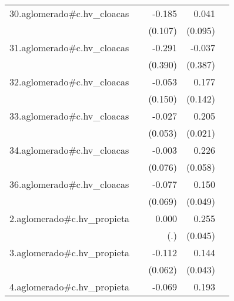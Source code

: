 {\begin{longtable}{l*{4}{D{.}{.}{-1}}}
\addlinespace
30.aglomerado#c.hv\_cloacas&                     &      -0.185         &       0.041         &                     \\
            &                     &     (0.107)         &     (0.095)         &                     \\
\addlinespace
31.aglomerado#c.hv\_cloacas&                     &      -0.291         &      -0.037         &                     \\
            &                     &     (0.390)         &     (0.387)         &                     \\
\addlinespace
32.aglomerado#c.hv\_cloacas&                     &      -0.053         &       0.177         &                     \\
            &                     &     (0.150)         &     (0.142)         &                     \\
\addlinespace
33.aglomerado#c.hv\_cloacas&                     &      -0.027         &       0.205\sym{***}&                     \\
            &                     &     (0.053)         &     (0.021)         &                     \\
\addlinespace
34.aglomerado#c.hv\_cloacas&                     &      -0.003         &       0.226\sym{***}&                     \\
            &                     &     (0.076)         &     (0.058)         &                     \\
\addlinespace
36.aglomerado#c.hv\_cloacas&                     &      -0.077         &       0.150\sym{**} &                     \\
            &                     &     (0.069)         &     (0.049)         &                     \\
\addlinespace
2.aglomerado#c.hv\_propieta&                     &       0.000         &       0.255\sym{***}&                     \\
            &                     &         (.)         &     (0.045)         &                     \\
\addlinespace
3.aglomerado#c.hv\_propieta&                     &      -0.112         &       0.144\sym{***}&                     \\
            &                     &     (0.062)         &     (0.043)         &                     \\
\addlinespace
4.aglomerado#c.hv\_propieta&                     &      -0.069         &       0.193\sym{***}&                     \\

\end{longtable}}
